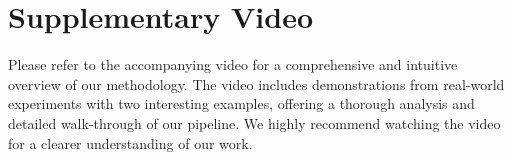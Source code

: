 \documentclass[conference]{IEEEtran}
\begin{document}





\section{Supplementary Video}
Please refer to the accompanying video for a comprehensive and intuitive overview of our methodology. The video includes demonstrations from real-world experiments with two interesting examples, offering a thorough analysis and detailed walk-through of our pipeline. We highly recommend watching the video for a clearer understanding of our work.
\end{document}
